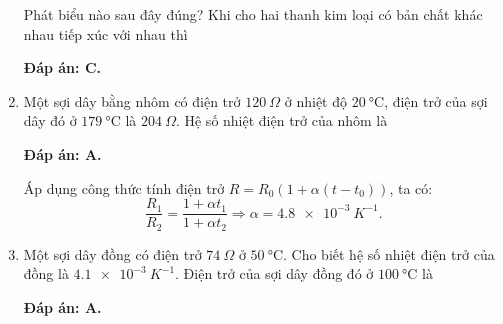 \begin{enumerate}[label=\bfseries Câu \arabic*:]
	\cauhoi
	{Phát biểu nào sau đây đúng? Khi cho hai thanh kim loại có bản chất khác nhau tiếp xúc với nhau thì
		
	}
	\loigiai
	{	\textbf{Đáp án: C.}
		
	}
	\item {}
	
	\cauhoi
	{Một sợi dây bằng nhôm có điện trở $\SI{120}{\Omega}$ ở nhiệt độ $\SI{20}{\celsius}$, điện trở của sợi dây đó ở $\SI{179}{\celsius}$ là $\SI{204}{\Omega}$. Hệ số nhiệt điện trở của nhôm là
		
	}
	\loigiai
	{	\textbf{Đáp án: A.}
		
		Áp dụng công thức tính điện trở $R=R_0 (1+ \alpha (t-t_0))$, ta có:
		$$\dfrac{R_1}{R_2} = \dfrac{1+ \alpha t_1}{1+ \alpha t_2} \Rightarrow \alpha = \SI{4.8e-3}{K^{-1}}.$$
	}
	\item {}
	
	\cauhoi
	{Một sợi dây đồng có điện trở $\SI{74}{\Omega}$ ở $\SI{50}{\celsius}$. Cho biết hệ số nhiệt điện trở của đồng là $\SI{4.1e-3}{K^{-1}}$. Điện trở của sợi dây đồng đó ở $\SI{100}{\celsius}$ là
		
	}
	\loigiai
	{	\textbf{Đáp án: A.}
		
}
\end{enumerate}
